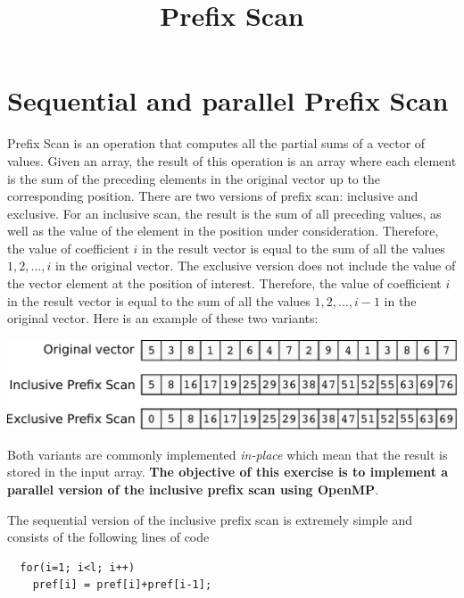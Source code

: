\documentclass{article}
\title{Prefix Scan}
\date{}
\begin{document}
\maketitle

\section{Sequential and parallel Prefix Scan}

Prefix Scan is an operation that computes all the partial sums of a
vector of values. Given an array, the result of this operation is an
array where each element is the sum of the preceding elements in the
original vector up to the corresponding position. There are two
versions of prefix scan: inclusive and exclusive. For an inclusive
scan, the result is the sum of all preceding values, as well as the
value of the element in the position under consideration. Therefore,
the value of coefficient $i$ in the result vector is equal to the sum
of all the values $1,2,...,i$ in the original vector. The exclusive
version does not include the value of the vector element at the
position of interest. Therefore, the value of coefficient $i$ in the
result vector is equal to the sum of all the values $1,2,...,i-1$ in
the original vector. Here is an example of these two variants:

\vspace{0.3cm}

\noindent\includegraphics[width=\textwidth]{prefscan_seq}

\vspace{0.3cm}

Both variants are commonly implemented {\it in-place} which mean that
the result is stored in the input array. {\bf The objective of this
exercise is to implement a parallel version of the inclusive prefix
scan using OpenMP}. 

The sequential version of the inclusive prefix scan is extremely
simple and consists of the following lines of code
\begin{verbatim}
  for(i=1; i<l; i++)
    pref[i] = pref[i]+pref[i-1];
\end{verbatim}
\end{document}

